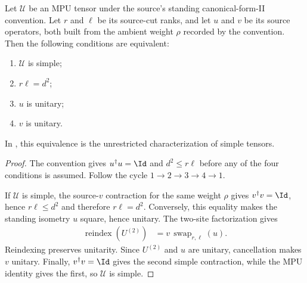 \begin{theorem}
    \label{ThmFund1}
    \leanok
    Let $\mathcal U$ be an MPU tensor under the source's standing
    canonical-form-II convention. Let $r$ and $\ell$ be its source-cut ranks,
    and let $u$ and $v$ be its source operators, both built from the ambient
    weight $\rho$ recorded by the convention. Then the following conditions
    are equivalent:
    \begin{enumerate}
        \item $\mathcal U$ is simple;
        \item $r\ell=d^2$;
        \item $u$ is unitary;
        \item $v$ is unitary.
    \end{enumerate}
    In \cite[Theorem~III.8]{Cirac2017MPU}, this equivalence is the unrestricted characterization of simple
    tensors.
\end{theorem}

\begin{proof}\leanok
    The convention gives $u^\dagger u=\Id$ and
    $d^2\leq r\ell$ before any of the four conditions is assumed. Follow the
    cycle $1\to2\to3\to4\to1$.

    If $\mathcal U$ is simple, the source-$v$ contraction for the same weight
    $\rho$ gives $v^\dagger v=\Id$, hence $r\ell\leq d^2$ and therefore
    $r\ell=d^2$. Conversely, this equality makes the standing isometry $u$
    square, hence unitary. The two-site factorization gives
    \begin{align}
        \operatorname{reindex}(U^{(2)})
         & =v\,\operatorname{swap}_{r,\ell}(u).
    \end{align}
    Reindexing preserves unitarity. Since $U^{(2)}$ and $u$ are unitary,
    cancellation makes $v$ unitary. Finally, $v^\dagger v=\Id$ gives the
    second simple contraction, while the MPU identity gives the first, so
    $\mathcal U$ is simple.
\end{proof}

